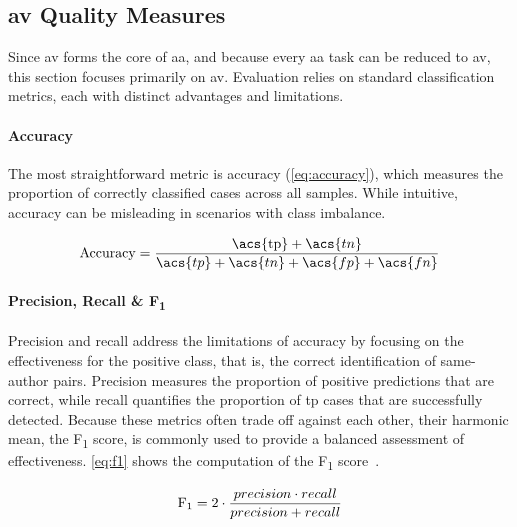 \subsection{\acs{av} Quality Measures}
\label{subsec:av_quality_measures}

Since \ac{av} forms the core of \ac{aa}, and because every \ac{aa} task can be reduced to \ac{av}, this section focuses primarily on \ac{av}. 
Evaluation relies on standard classification metrics, each with distinct advantages and limitations.

\paragraph{Accuracy}
The most straightforward metric is accuracy (\autoref{eq:accuracy}), which measures the proportion of correctly classified cases across all samples. 
While intuitive, accuracy can be misleading in scenarios with class imbalance. 

\begin{equation}\label{eq:accuracy}
    \text{Accuracy} = \frac{\text{\acs{tp}} + \acs{tn}}{\acs{tp} + \acs{tn} + \acs{fp} + \acs{fn}}
\end{equation}

\paragraph{Precision, Recall \& F\textsubscript{1}}
Precision and recall address the limitations of accuracy by focusing on the effectiveness for the positive class, that is, the correct identification of same-author pairs. 
Precision measures the proportion of positive predictions that are correct, while recall quantifies the proportion of \ac{tp} cases that are successfully detected. 
Because these metrics often trade off against each other, their harmonic mean, the F\textsubscript{1} score, is commonly used to provide a balanced assessment of effectiveness. 
\autoref{eq:f1} shows the computation of the F\textsubscript{1} score~\citep{neal_surveying_2018}.

\begin{equation}\label{eq:f1}
     \text{F\textsubscript{1}} = 2 \cdot \frac{precision \cdot recall}{precision + recall}
\end{equation}

